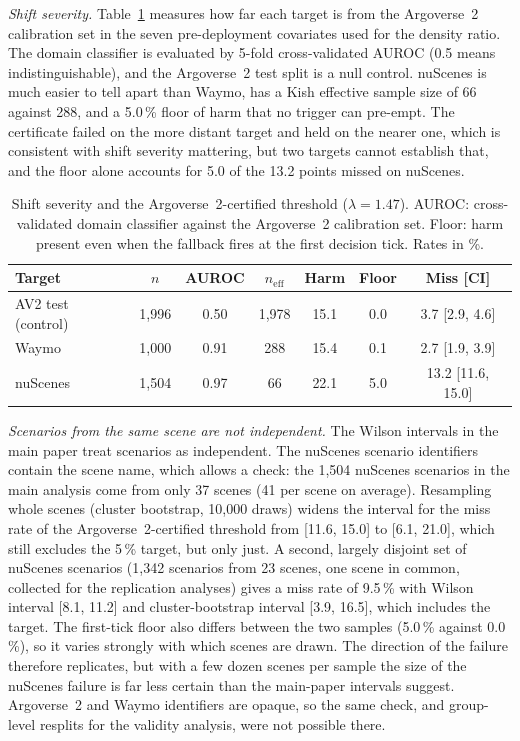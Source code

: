 \documentclass[lettersize,journal]{IEEEtran}
\begin{document}
\emph{Shift severity.} Table~\ref{tab:severity} measures how far each
target is from the Argoverse~2 calibration set in the seven
pre-deployment covariates used for the density ratio. The domain
classifier is evaluated by 5-fold cross-validated AUROC (0.5 means
indistinguishable), and the Argoverse~2 test split is a null control.
nuScenes is much easier to tell apart than Waymo, has a Kish effective
sample size of 66 against 288, and a 5.0\,\% floor of harm that no trigger
can pre-empt. The certificate failed on the more distant target and held
on the nearer one, which is consistent with shift severity mattering,
but two targets cannot establish that, and the floor alone accounts for
5.0 of the 13.2 points missed on nuScenes.

\begin{table}[h]
\caption{Shift severity and the Argoverse~2-certified threshold
($\lambda = 1.47$). AUROC: cross-validated domain classifier against
the Argoverse~2 calibration set. Floor: harm present even when the
fallback fires at the first decision tick. Rates in \%.}
\label{tab:severity}
\centering
\scriptsize\setlength{\tabcolsep}{2.5pt}
\begin{tabular}{lcccccc}
\toprule
Target & $n$ & AUROC & $n_{\mathrm{eff}}$ & Harm & Floor & Miss [CI] \\
\midrule
AV2 test (control) & 1{,}996 & 0.50 & 1{,}978 & 15.1 & 0.0 & 3.7 [2.9, 4.6] \\
Waymo & 1{,}000 & 0.91 & 288 & 15.4 & 0.1 & 2.7 [1.9, 3.9] \\
nuScenes & 1{,}504 & 0.97 & 66 & 22.1 & 5.0 & 13.2 [11.6, 15.0] \\
\bottomrule
\end{tabular}
\end{table}

\emph{Scenarios from the same scene are not independent.} The Wilson
intervals in the main paper treat scenarios as independent. The nuScenes
scenario identifiers contain the scene name, which allows a check:
the 1{,}504 nuScenes scenarios in the main analysis come from only 37
scenes (41 per scene on average). Resampling whole scenes
(cluster bootstrap, 10{,}000 draws) widens the interval for the miss rate
of the Argoverse~2-certified threshold from [11.6, 15.0] to [6.1, 21.0],
which still excludes the 5\,\% target, but only just. A second, largely
disjoint set of nuScenes scenarios (1{,}342 scenarios from 23 scenes, one
scene in common, collected for the replication analyses) gives a miss rate
of 9.5\,\% with Wilson interval [8.1, 11.2] and cluster-bootstrap interval
[3.9, 16.5], which includes the target. The first-tick floor also differs
between the two samples (5.0\,\% against 0.0\,\%), so it varies strongly
with which scenes are drawn. The direction of the failure therefore
replicates, but with a few dozen scenes per sample the size of the
nuScenes failure is far less certain than the main-paper intervals
suggest. Argoverse~2 and Waymo identifiers are opaque, so the same
check, and group-level resplits for the validity analysis, were not
possible there.
\end{document}
